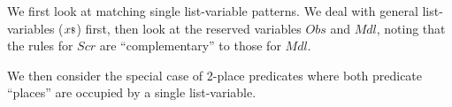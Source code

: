 
We first look at matching single list-variable patterns.
We deal with general list-variables (${x}{\scriptstyle\$}$) first,
then look at the reserved variables $Obs$ and $Mdl$,
noting that the rules for $Scr$ are ``complementary'' to those for $Mdl$.

\MRLISTVAR

We then consider the special case of 2-place predicates
where both predicate ``places'' are occupied by a single list-variable.

\MRTWOPLACE
